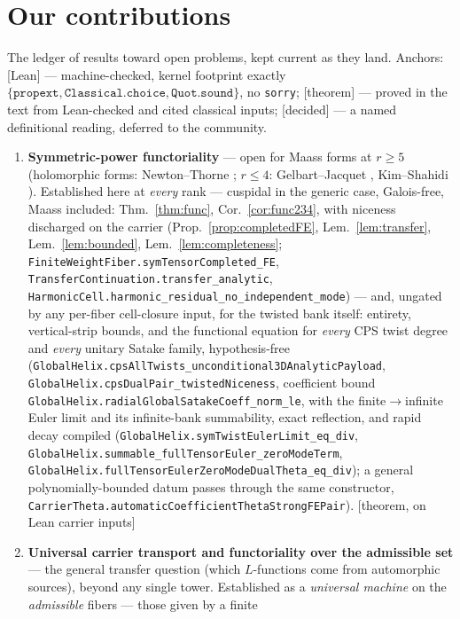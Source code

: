 \documentclass[11pt]{article}
\theoremstyle{definition}
\begin{document}
\section*{Our contributions}

\noindent The ledger of results toward open problems, kept current as they land. Anchors:
[Lean] --- machine-checked, kernel footprint exactly
$\{\texttt{propext},\texttt{Classical.choice},\texttt{Quot.sound}\}$, no \texttt{sorry};
[theorem] --- proved in the text from Lean-checked and cited classical inputs; [decided] --- a
named definitional reading, deferred to the community.

\begin{enumerate}
\item \textbf{Symmetric-power functoriality} --- open for Maass forms at $r\ge5$ (holomorphic
forms: Newton--Thorne \cite{NT}; $r\le4$: Gelbart--Jacquet \cite{GJ}, Kim--Shahidi
\cite{KimShahidi}). Established here at \emph{every} rank --- cuspidal in the generic case,
Galois-free, Maass included: Thm.~\ref{thm:func}, Cor.~\ref{cor:func234}, with niceness
discharged on the carrier (Prop.~\ref{prop:completedFE}, Lem.~\ref{lem:transfer},
Lem.~\ref{lem:bounded}, Lem.~\ref{lem:completeness}; \texttt{FiniteWeightFiber.symTensorCompleted\_FE},
\texttt{TransferContinuation.transfer\_analytic},
\texttt{HarmonicCell.harmonic\_residual\_no\_independent\_mode}) --- and, ungated by any per-fiber
cell-closure input, for the twisted bank itself: entirety, vertical-strip bounds, and the functional
equation for \emph{every} CPS twist degree and \emph{every} unitary Satake family, hypothesis-free
(\texttt{GlobalHelix.cpsAllTwists\_unconditional3DAnalyticPayload},
\texttt{GlobalHelix.cpsDualPair\_twistedNiceness}, coefficient bound
\texttt{GlobalHelix.radialGlobalSatakeCoeff\_norm\_le}, with the finite$\to$infinite Euler limit and
its infinite-bank summability, exact reflection, and rapid decay compiled
(\texttt{GlobalHelix.symTwistEulerLimit\_eq\_div},
\texttt{GlobalHelix.summable\_fullTensorEuler\_zeroModeTerm},
\texttt{GlobalHelix.fullTensorEulerZeroModeDualTheta\_eq\_div}); a general polynomially-bounded datum
passes through the same constructor,
\texttt{CarrierTheta.automaticCoefficientThetaStrongFEPair}). [theorem, on Lean carrier inputs]
\item \textbf{Universal carrier transport and functoriality over the admissible set} --- the general
transfer question (which $L$-functions come from automorphic sources), beyond any single tower.
Established as a \emph{universal machine} on the \emph{admissible} fibers --- those given by a finite

\end{enumerate}
\end{document}
